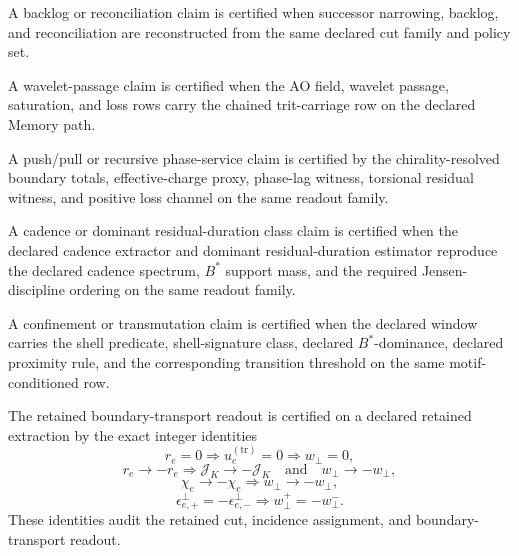 \begin{hook}
\label{hook:h4}
A backlog or reconciliation claim is certified when successor narrowing, backlog, and reconciliation are reconstructed from the same declared cut family and policy set.
\end{hook}

\begin{hook}
\label{hook:h5}
A wavelet-passage claim is certified when the AO field, wavelet passage, saturation, and loss rows carry the chained trit-carriage row on the declared Memory path.
\end{hook}

\begin{hook}
\label{hook:h6}
A push/pull or recursive phase-service claim is certified by the chirality-resolved boundary totals, effective-charge proxy, phase-lag witness, torsional residual witness, and positive loss channel on the same readout family.
\end{hook}

\begin{hook}
\label{hook:h7}
A cadence or dominant residual-duration class claim is certified when the declared cadence extractor and dominant residual-duration estimator reproduce the declared cadence spectrum, $B^*$ support mass, and the required Jensen-discipline ordering on the same readout family.
\end{hook}

\begin{hook}
\label{hook:h8}
A confinement or transmutation claim is certified when the declared window carries the shell predicate, shell-signature class, declared $B^*$-dominance, declared proximity rule, and the corresponding transition threshold on the same motif-conditioned row.
\end{hook}

\begin{hook}
\label{hook:h9}
The retained boundary-transport readout is certified on a declared retained extraction by the exact integer identities
\[
r_e=0
\Rightarrow
u_e^{(\mathrm{tr})}=0
\Rightarrow
w_{\perp}=0,
\]
\[
r_e\to-r_e
\Rightarrow
\mathcal J_K\to-\mathcal J_K
\quad\text{and}\quad
w_{\perp}\to-w_{\perp},
\]
\[
\chi_e\to-\chi_e
\Rightarrow
w_{\perp}\to-w_{\perp},
\]
\[
\epsilon_{e,+}^{\perp}=-\epsilon_{e,-}^{\perp}
\Rightarrow
w_{\perp}^{+}=-w_{\perp}^{-}.
\]
These identities audit the retained cut, incidence assignment, and boundary-transport readout.
\end{hook}
